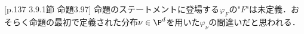 

[p.137 3.9.1節 命題3.97] 命題のステートメントに登場する$\varphi_F$の"$F$"は未定義．おそらく命題の最初で定義された分布$\nu\in\P^d$を用いた$\varphi_\nu$の間違いだと思われる．

